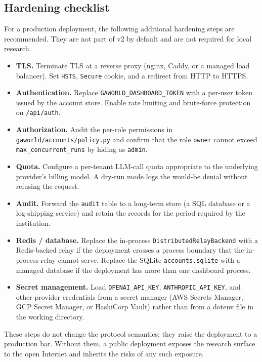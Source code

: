 \subsection{Hardening checklist}

For a production deployment, the following additional hardening steps
are recommended.  They are not part of v2 by default and are not
required for local research.

\begin{itemize}[leftmargin=*]
  \item \textbf{TLS.}  Terminate TLS at a reverse proxy (nginx,
  Caddy, or a managed load balancer).  Set
  \texttt{HSTS}, \texttt{Secure} cookie, and a redirect from HTTP
  to HTTPS.
  \item \textbf{Authentication.}  Replace
  \texttt{GAWORLD\_DASHBOARD\_TOKEN} with a per-user token issued by
  the account store.  Enable rate limiting and brute-force
  protection on \texttt{/api/auth}.
  \item \textbf{Authorization.}  Audit the per-role permissions in
  \texttt{gaworld/accounts/policy.py} and confirm that the role
  \texttt{owner} cannot exceed \texttt{max\_concurrent\_runs} by
  hiding as \texttt{admin}.
  \item \textbf{Quota.}  Configure a per-tenant LLM-call quota
  appropriate to the underlying provider's billing model.  A dry-run
  mode logs the would-be denial without refusing the request.
  \item \textbf{Audit.}  Forward the \texttt{audit} table to a
  long-term store (a SQL database or a log-shipping service) and
  retain the records for the period required by the institution.
  \item \textbf{Redis / database.}  Replace the in-process
  \texttt{DistributedRelayBackend} with a Redis-backed relay if
  the deployment crosses a process boundary that the in-process
  relay cannot serve.  Replace the SQLite \texttt{accounts.sqlite}
  with a managed database if the deployment has more than one
  dashboard process.
  \item \textbf{Secret management.}  Load \texttt{OPENAI\_API\_KEY},
  \texttt{ANTHROPIC\_API\_KEY}, and other provider credentials from
  a secret manager (AWS Secrets Manager, GCP Secret Manager, or
  HashiCorp Vault) rather than from a dotenv file in the working
  directory.
\end{itemize}

These steps do not change the protocol semantics; they raise the
deployment to a production bar.  Without them, a public deployment
exposes the research surface to the open Internet and inherits the
risks of any such exposure.

